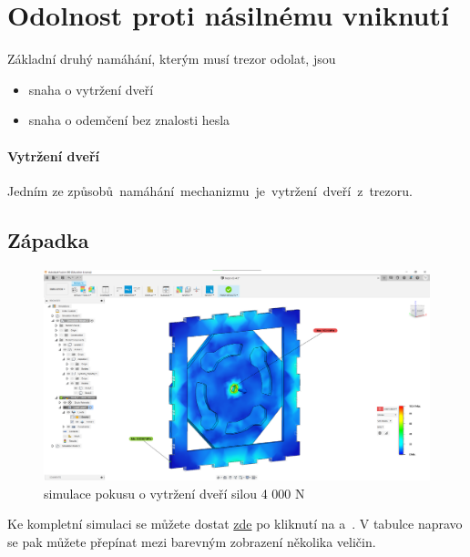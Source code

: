 \section{Odolnost proti násilnému vniknutí}
Základní druhý namáhání, kterým musí trezor odolat, jsou

\begin{itemize}
    \item snaha o vytržení dveří 
    \item snaha o odemčení bez znalosti hesla
\end{itemize}

\paragraph{Vytržení dveří}
Jedním ze způsobů~namáhání~mechanizmu~je~vytržení~dveří~z~trezoru.

\subsection{Západka}

\begin{figure}[htbp]
    \centering
    \includegraphics[width=\textwidth]{kapitoly/obrazky/M3/simulace/odolnost_proti_vytrzeni_4kN.png}
    \caption{simulace pokusu o vytržení dveří silou 4 000 N}
    \label{fig:M3-simulace-vytrzeni}
\end{figure}
Ke kompletní simulaci se můžete dostat \href{https://myhub.autodesk360.com/ue2d7aa41/g/shares/SH56a43QTfd62c1cd96843f1e03a0eb48053?viewState=NoIgbgDAdAjCA0IDeAdEAXAngBwKZoC40BlASwFsBXAGwEN1SB7AOzXjVoGdPd1C0ARjABsATlEQItALQBjcbmkAWCMIjSBuWgA5lAM22ilAVgAmMAOyy9\%2BBGkYCAVrlnoAkqcIBmAL4gAukA}{zde}
po kliknutí na  a~. V tabulce napravo se pak můžete přepínat mezi barevným zobrazení několika veličin.

